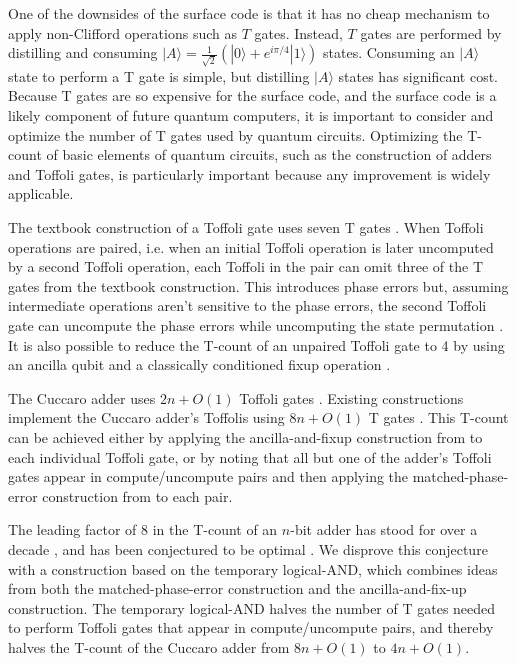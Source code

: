 \documentclass[twocolumn]{revtex4-1}
\begin{document}
One of the downsides of the surface code is that it has no cheap mechanism to apply non-Clifford operations such as $T$ gates.
Instead, $T$ gates are performed by distilling and consuming $|A\rangle = \frac{1}{\sqrt{2}} (|0\rangle + e^{i \pi/4} |1\rangle)$ states.
Consuming an $|A\rangle$ state to perform a T gate is simple, but distilling $|A\rangle$ states has significant cost.
Because T gates are so expensive for the surface code, and the surface code is a likely component of future quantum computers, it is important to consider and optimize the number of T gates used by quantum circuits.
Optimizing the T-count of basic elements of quantum circuits, such as the construction of adders and Toffoli gates, is particularly important because any improvement is widely applicable.

The textbook construction of a Toffoli gate uses seven T gates \citep{Nielsen2009}.
When Toffoli operations are paired, i.e. when an initial Toffoli operation is later uncomputed by a second Toffoli operation, each Toffoli in the pair can omit three of the T gates from the textbook construction.
This introduces phase errors but, assuming intermediate operations aren't sensitive to the phase errors, the second Toffoli gate can uncompute the phase errors while uncomputing the state permutation \citep{Barenco1995, Nielsen2009}.
It is also possible to reduce the T-count of an unpaired Toffoli gate to 4 by using an ancilla qubit and a classically conditioned fixup operation \citep{Jones2013}.

The Cuccaro adder uses $2n + O(1)$ Toffoli gates \citep{Cuccaro2004}.
Existing constructions implement the Cuccaro adder's Toffolis using $8n + O(1)$ T gates \citep{Barenco1995, Cuccaro2004, Amy2013}.
This T-count can be achieved either by applying the ancilla-and-fixup construction from \citep{Jones2013} to each individual Toffoli gate, or by noting that all but one of the adder's Toffoli gates appear in compute/uncompute pairs and then applying the matched-phase-error construction from \citep{Barenco1995, Nielsen2009} to each pair.

The leading factor of 8 in the T-count of an $n$-bit adder has stood for over a decade \citep{Barenco1995, Cuccaro2004}, and has been conjectured to be optimal \cite{AustinDiscussionsAndEmails2017}.
We disprove this conjecture with a construction based on the temporary logical-AND, which combines ideas from both the matched-phase-error construction and the ancilla-and-fix-up construction.
The temporary logical-AND halves the number of T gates needed to perform Toffoli gates that appear in compute/uncompute pairs, and thereby halves the T-count of the Cuccaro adder from $8n + O(1)$ to $4n + O(1)$.
\end{document}
